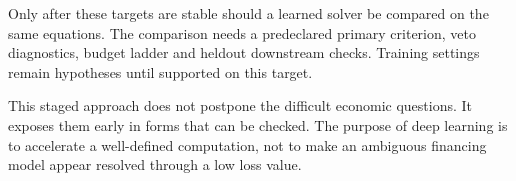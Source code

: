 Only after these targets are stable should a learned solver be compared on the same equations. The comparison needs a predeclared primary criterion, veto diagnostics, budget ladder and heldout downstream checks. Training settings remain hypotheses until supported on this target.

This staged approach does not postpone the difficult economic questions. It exposes them early in forms that can be checked. The purpose of deep learning is to accelerate a well-defined computation, not to make an ambiguous financing model appear resolved through a low loss value.
